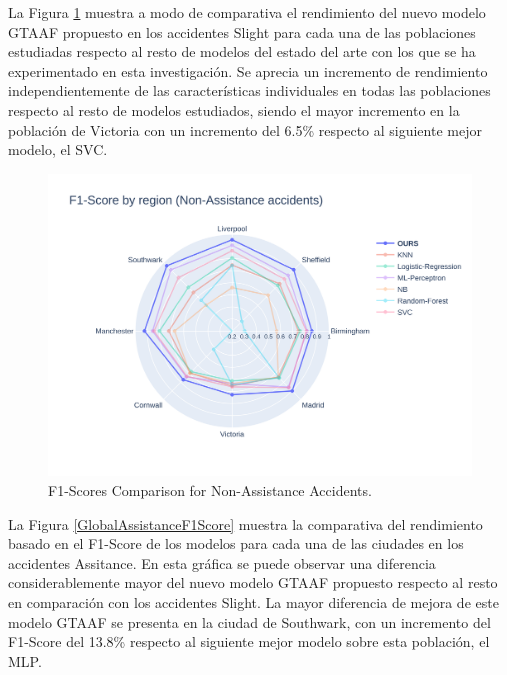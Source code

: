 \documentclass{uathesis-es}
\begin{document}
{	
	La Figura \ref{GlobalSlightF1Score} muestra a modo de comparativa el rendimiento del nuevo modelo GTAAF propuesto en los accidentes Slight para cada una de las poblaciones estudiadas respecto al resto de modelos del estado del arte con los que se ha experimentado en esta investigación. Se aprecia un incremento de rendimiento independientemente de las características individuales en todas las poblaciones respecto al resto de modelos estudiados, siendo el mayor incremento en la población de Victoria con un incremento del 6.5\% respecto al siguiente mejor modelo, el SVC.
	
	\begin{figure}[H]
		\centering
		\includegraphics[width=150mm]{Figures/Slight.png}
		\caption{F1-Scores Comparison for Non-Assistance Accidents.}
		\label{GlobalSlightF1Score}
	\end{figure}
	
	La Figura \ref{GlobalAssistanceF1Score} muestra la comparativa del rendimiento basado en el F1-Score de los modelos para cada una de las ciudades en los accidentes Assitance. En esta gráfica se puede observar una diferencia considerablemente mayor del nuevo modelo GTAAF propuesto respecto al resto en comparación con los accidentes Slight. La mayor diferencia de mejora de este modelo GTAAF se presenta en la ciudad de Southwark, con un incremento del F1-Score del 13.8\% respecto al siguiente mejor modelo sobre esta población, el MLP.
	
}
\end{document}
